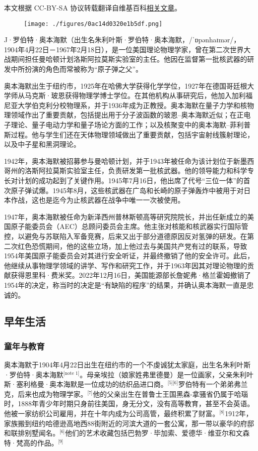 
本文根据 CC-BY-SA 协议转载翻译自维基百科\href{https://en.wikipedia.org/wiki/J._Robert_Oppenheimer}{相关文章}。

\begin{figure}[ht]
\centering
\texttt{[image: ./figures/0ac14d0320e1b5df.png]}
\caption{} \label{fig_ABHM_1}
\end{figure}
J·罗伯特·奥本海默（出生名朱利叶斯·罗伯特·奥本海默，/ˈɒpənhaɪmər/，1904年4月22日－1967年2月18日），是一位美国理论物理学家，曾在第二次世界大战期间担任曼哈顿计划洛斯阿拉莫斯实验室的主任。他因在监督第一批核武器的研发中所扮演的角色而常被称为“原子弹之父”。

奥本海默出生于纽约市，1925年在哈佛大学获得化学学位，1927年在德国哥廷根大学师从马克斯·玻恩获得物理学博士学位。在其他机构从事研究后，他加入加利福尼亚大学伯克利分校物理系，并于1936年成为正教授。奥本海默在量子力学和核物理领域作出了重要贡献，包括提出用于分子波函数的玻恩–奥本海默近似；在正电子理论、量子电动力学和量子场论方面的工作；以及核聚变中的奥本海默–菲利普斯过程。他与学生们还在天体物理领域做出了重要贡献，包括宇宙射线簇射理论，以及中子星和黑洞理论。

1942年，奥本海默被招募参与曼哈顿计划，并于1943年被任命为该计划位于新墨西哥州的洛斯阿拉莫斯实验室主任，负责研发第一批核武器。他的领导能力和科学专长对计划的成功起到了关键作用。1945年7月16日，他出席了代号“三位一体”的首次原子弹试爆。1945年8月，这些核武器在广岛和长崎的原子弹轰炸中被用于对日本作战，这也是迄今为止核武器在战争中唯一一次被使用。

1947年，奥本海默被任命为新泽西州普林斯顿高等研究院院长，并出任新成立的美国原子能委员会（AEC）总顾问委员会主席。他主张对核能和核武器实行国际管控，以避免与苏联陷入军备竞赛，后来又出于部分道德原因反对氢弹的研发。在第二次红色恐慌期间，他的这些立场，加上他过去与美国共产党有过的联系，导致1954年美国原子能委员会对其进行安全听证，并最终撤销了他的安全许可。此后，他继续从事物理学领域的讲学、写作和研究工作，并于1963年因其对理论物理的贡献获得恩里科·费米奖。2022年12月16日，美国能源部长詹妮弗·格兰霍姆撤销了1954年的决定，称当时的决定是“有缺陷的程序”的结果，并确认奥本海默一直是忠诚的。
\subsection{早年生活}
\subsubsection{童年与教育}
奥本海默于1904年4月22日出生在纽约市的一个不虔诚犹太家庭，出生名朱利叶斯·罗伯特·奥本海默\(^\text{[note 1]}\)。母亲埃拉（娘家姓弗里德曼）是一位画家，父亲朱利叶斯·塞利格曼·奥本海默是一位成功的纺织品进口商。\(^\text{[5][6]}\)罗伯特有一个弟弟弗兰克，后来也成为物理学家。\(^\text{[7]}\)他的父亲出生在普鲁士王国黑森-拿骚省仍属于哈瑙时，1888年青少年时期只身前往美国，身无分文，没有高等教育，甚至不会英语。他被一家纺织公司雇用，并在十年内成为公司高管，最终积累了财富。\(^\text{[8]}\)1912年，家族搬到纽约哈德逊高地西88街附近的河滨大道的一套公寓，那一带以豪华的府邸和联排别墅闻名。\(^\text{[6]}\)他们的艺术收藏包括巴勃罗·毕加索、爱德华·维亚尔和文森特·梵高的作品。\(^\text{[9]}\)

